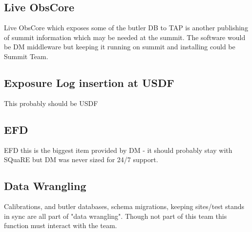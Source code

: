 \subsection{ Live ObsCore}
Live ObsCore  which exposes some of the butler DB to TAP is another publishing of summit information which may be needed at the summit.
The software would be DM middleware but keeping it running on summit and installing could be Summit Team.

\subsection{ Exposure Log  insertion at \gls{USDF}}
  This probably  should be \gls{USDF}

\subsection{ \gls{EFD}}
 EFD this is the biggest item provided by \gls{DM} - it should probably stay with SQuaRE but \gls{DM} was never sized for 24/7 support.

\subsection{ Data Wrangling }
Calibrations, and butler databases, schema migrations, keeping sites/test stands in sync are all
part of "data wrangling".
Though not part of this team this function must interact with the team.

